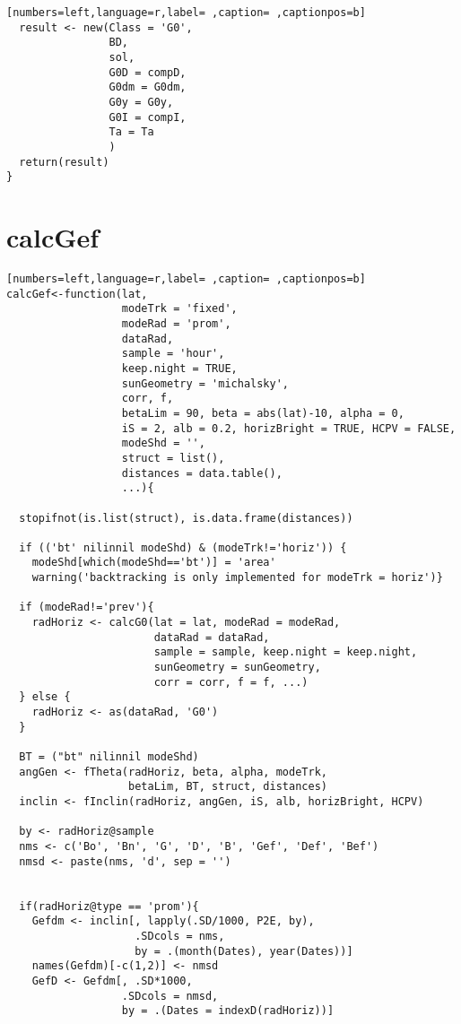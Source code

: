 \begin{lstlisting}[numbers=left,language=r,label= ,caption= ,captionpos=b]
  result <- new(Class = 'G0',
                BD,        
                sol,       
                G0D = compD, 
                G0dm = G0dm, 
                G0y = G0y,   
                G0I = compI, 
                Ta = Ta      
                )
  return(result)
}
\end{lstlisting}
\section{calcGef}
\label{sec:org01a128c}
\begin{lstlisting}[numbers=left,language=r,label= ,caption= ,captionpos=b]
calcGef<-function(lat,
                  modeTrk = 'fixed',      
                  modeRad = 'prom', 
                  dataRad,
                  sample = 'hour',
                  keep.night = TRUE,
                  sunGeometry = 'michalsky',
                  corr, f,
                  betaLim = 90, beta = abs(lat)-10, alpha = 0,
                  iS = 2, alb = 0.2, horizBright = TRUE, HCPV = FALSE,
                  modeShd = '',    
                  struct = list(), 
                  distances = data.table(),
                  ...){

  stopifnot(is.list(struct), is.data.frame(distances))

  if (('bt' nilinnil modeShd) & (modeTrk!='horiz')) {
    modeShd[which(modeShd=='bt')] = 'area'
    warning('backtracking is only implemented for modeTrk = horiz')}

  if (modeRad!='prev'){ 
    radHoriz <- calcG0(lat = lat, modeRad = modeRad,
                       dataRad = dataRad,
                       sample = sample, keep.night = keep.night,
                       sunGeometry = sunGeometry,
                       corr = corr, f = f, ...)
  } else {                          
    radHoriz <- as(dataRad, 'G0') 
  } 

  BT = ("bt" nilinnil modeShd) 
  angGen <- fTheta(radHoriz, beta, alpha, modeTrk,
                   betaLim, BT, struct, distances)
  inclin <- fInclin(radHoriz, angGen, iS, alb, horizBright, HCPV)

  by <- radHoriz@sample
  nms <- c('Bo', 'Bn', 'G', 'D', 'B', 'Gef', 'Def', 'Bef')
  nmsd <- paste(nms, 'd', sep = '')


  if(radHoriz@type == 'prom'){
    Gefdm <- inclin[, lapply(.SD/1000, P2E, by),
                    .SDcols = nms,
                    by = .(month(Dates), year(Dates))]
    names(Gefdm)[-c(1,2)] <- nmsd
    GefD <- Gefdm[, .SD*1000,
                  .SDcols = nmsd,
                  by = .(Dates = indexD(radHoriz))]


\end{lstlisting}
